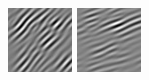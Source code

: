 \begin{figure}
\begin{center}
  \includegraphics[width=\columnwidth/9]{ch4/figures/imag_1_2.jpg}
  \includegraphics[width=\columnwidth/9]{ch4/figures/imag_1_3.jpg}

\end{center}
\end{figure}
